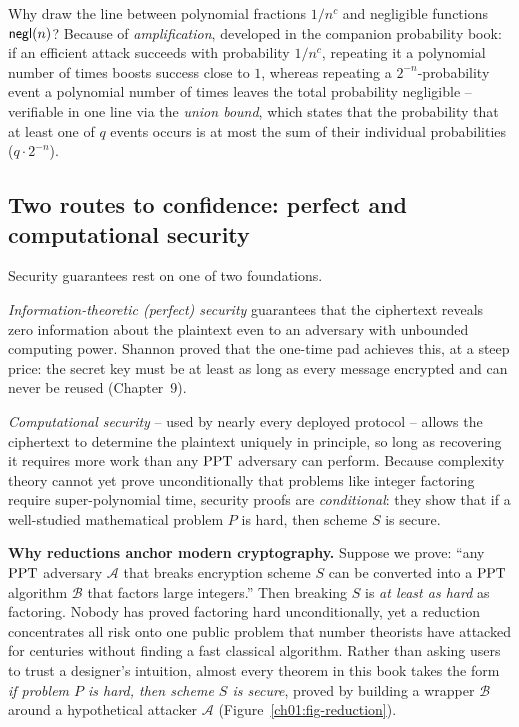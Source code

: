\begin{connectionbox}
Why draw the line between polynomial fractions $1/n^c$ and negligible functions $\mathsf{negl}(n)$? Because of \emph{amplification}, developed in the companion probability book: if an efficient attack succeeds with probability $1/n^c$, repeating it a polynomial number of times boosts success close to $1$, whereas repeating a $2^{-n}$-probability event a polynomial number of times leaves the total probability negligible -- verifiable in one line via the \emph{union bound}, which states that the probability that at least one of $q$ events occurs is at most the sum of their individual probabilities ($q \cdot 2^{-n}$).
\end{connectionbox}

\subsection*{Two routes to confidence: perfect and computational security}

Security guarantees rest on one of two foundations.

\emph{Information-theoretic (perfect) security} guarantees that the ciphertext reveals zero information about the plaintext even to an adversary with unbounded computing power. Shannon proved that the one-time pad achieves this, at a steep price: the secret key must be at least as long as every message encrypted and can never be reused (Chapter~9).

\emph{Computational security} -- used by nearly every deployed protocol -- allows the ciphertext to determine the plaintext uniquely in principle, so long as recovering it requires more work than any $\mathrm{PPT}$ adversary can perform. Because complexity theory cannot yet prove unconditionally that problems like integer factoring require super-polynomial time, security proofs are \emph{conditional}: they show that if a well-studied mathematical problem $P$ is hard, then scheme $S$ is secure.

\begin{whybox}
\textbf{Why reductions anchor modern cryptography.} Suppose we prove: ``any $\mathrm{PPT}$ adversary $\mathcal{A}$ that breaks encryption scheme $S$ can be converted into a $\mathrm{PPT}$ algorithm $\mathcal{B}$ that factors large integers.'' Then breaking $S$ is \emph{at least as hard} as factoring. Nobody has proved factoring hard unconditionally, yet a reduction concentrates all risk onto one public problem that number theorists have attacked for centuries without finding a fast classical algorithm. Rather than asking users to trust a designer's intuition, almost every theorem in this book takes the form \emph{if problem $P$ is hard, then scheme $S$ is secure}, proved by building a wrapper $\mathcal{B}$ around a hypothetical attacker $\mathcal{A}$ (Figure~\ref{ch01:fig-reduction}).
\end{whybox}


